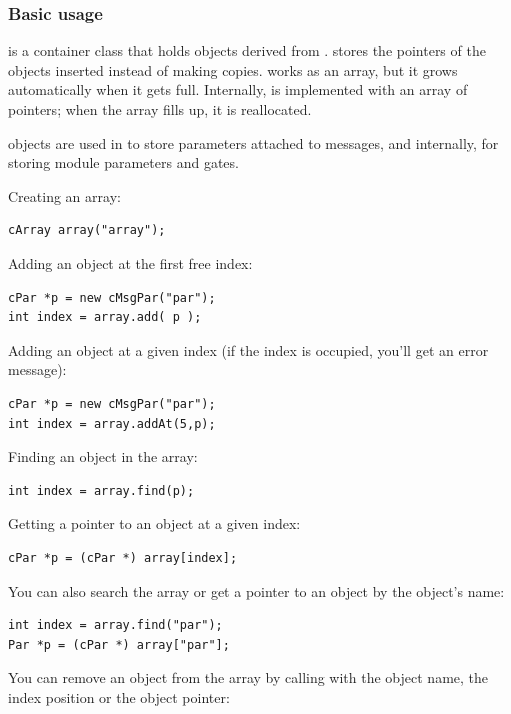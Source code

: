 \subsubsection{Basic usage}


 is a container class that holds objects derived from
.  stores the pointers of the objects
inserted instead of making copies.  works as an array,
but it grows automatically when it gets full. Internally,
 is implemented with an array of pointers; when the array
fills up, it is reallocated.

 objects are used in {\opp} to store parameters
attached to messages, and internally, for storing module parameters
and gates.


Creating an array:

\begin{verbatim}
cArray array("array");
\end{verbatim}

Adding an object at the first free index:

\begin{verbatim}
cPar *p = new cMsgPar("par");
int index = array.add( p );
\end{verbatim}


Adding an object at a given index (if the index is occupied,
you'll get an error message):

\begin{verbatim}
cPar *p = new cMsgPar("par");
int index = array.addAt(5,p);
\end{verbatim}


Finding an object in the array:

\begin{verbatim}
int index = array.find(p);
\end{verbatim}

Getting a pointer to an object at a given index:

\begin{verbatim}
cPar *p = (cPar *) array[index];
\end{verbatim}

You can also search the array or get a pointer to an object by
the object's name:

\begin{verbatim}
int index = array.find("par");
Par *p = (cPar *) array["par"];
\end{verbatim}


You can remove an object from the array by calling 
with the object name, the index position or the object pointer:

